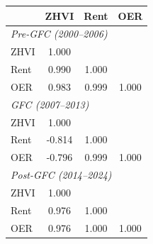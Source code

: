\begin{tabular}{l*{3}{c}}
\doublerule
& ZHVI & Rent & OER \\
\midrule \multicolumn{4}{l}{\textit{Pre-GFC (2000--2006)}} \\[0.3em]
ZHVI            &    1.000&         &         \\
Rent            &    0.990&    1.000&         \\
OER             &    0.983&    0.999&    1.000\\
\midrule \multicolumn{4}{l}{\textit{GFC (2007--2013)}} \\[0.3em]
ZHVI            &    1.000&         &         \\
Rent            &   -0.814&    1.000&         \\
OER             &   -0.796&    0.999&    1.000\\
\midrule \multicolumn{4}{l}{\textit{Post-GFC (2014--2024)}} \\[0.3em]
ZHVI            &    1.000&         &         \\
Rent            &    0.976&    1.000&         \\
OER             &    0.976&    1.000&    1.000\\
\midrule
\end{tabular}
